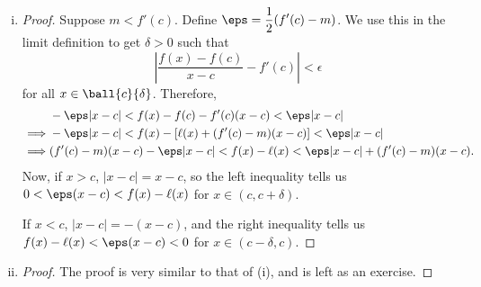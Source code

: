 \begin{comment}
	\draw[-, thick, smooth, domain = 0.5:4.5, samples = 100, variable = \x] plot ({\x}, {sqrt(\x - 0.5) - 0.5});
	
	\draw[-, thick, smooth, domain = -0.7:4.5, samples = 100, variable = \x, red] plot ({\x}, {0.3*\x - 0.05916});
	
	\draw[-, thick, smooth, domain = 0.5:2, samples = 100, variable = \x, blue] plot ({\x}, {3*\x - 3});
	
	\node[right] at (2,3.5) {\small \color{blue}\(f(x)+m(x-c)\)};
	
	\node[right] at (2,3) {\small \color{blue}\(m>f'(c)\)};
	
	\draw[-, dashed, thick, smooth, domain = -0.7:4, samples = 100, variable = \x] plot ({\x}, {0.97*\x - 0.788924});
	
	\node[right, below] at (4.5,1) {\small \color{red}\(f(x)+m(x-c)\)};
	
	\node[right, below] at (4.5,0.63) {\small \color{red}\(m<f'(c)\)};
	
	\draw[-, dashed, thick] (1.0892,0.2676)--(1.0892,0);
	
	\node[below] at (1.0892,0) {\(c\)};
	
	\node[] at (0.5,0) {\((\)};
	
	\node[] at (1.5,0) {\()\)};
	
	
\end{comment}

\begin{enumerate}[(i)]
	\item 
	\begin{proof}
		Suppose \(m<f'(c)\). Define \(\eps=\displaystyle\frac{1}{2}(f'(c)-m)\). We use this in the limit definition to get \(\delta>0\) such that 
		\begin{equation*}
			\left|\frac{f(x)-f(c)}{x-c}-f'(c)\right|<\epsilon
		\end{equation*}
		for all \(x\in\ball{c}{\delta}\). Therefore,
		\begin{align*}
			&-\eps|x-c|<f(x)-f(c)-f'(c)(x-c)<\eps|x-c|\\
	\implies&-\eps|x-c|<f(x)-[\ell(x)+(f'(c)-m)(x-c)]<\eps|x-c|\\
	\implies&(f'(c)-m)(x-c)-\eps|x-c|<f(x)-\ell(x)<\eps|x-c|+(f'(c)-m)(x-c).
		\end{align*}
		Now, if \(x>c\), \(|x-c|=x-c\), so the left inequality tells us \(0<\eps(x-c)<f(x)-\ell(x)\) for \(x\in (c,c+\delta)\). 
		
		\smallskip
		
		If \(x<c\), \(|x-c|=-(x-c)\), and the right inequality tells us \(f(x)-\ell(x)<\eps(x-c)<0\) for \(x\in (c-\delta,c)\).
	\end{proof}
	
	\item 
	\begin{proof}
		The proof is very similar to that of (i), and is left as an exercise.
	\end{proof}
\end{enumerate}

